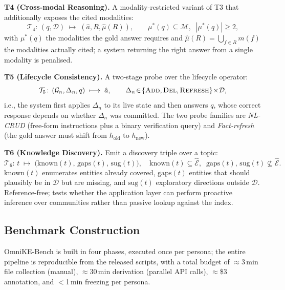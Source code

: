 \documentclass{article}
\begin{document}
\noindent\textbf{T4 (Cross-modal Reasoning).} A modality-restricted variant of T3 that additionally exposes the cited modalities:
\begin{equation}
\mathcal{T}_4\!:\,(q,\mathcal{D})\;\longmapsto\;(\hat{a},R,\hat{\mu}(R)),\qquad \mu^{*}(q)\!\subseteq\!\mathcal{M},\;\;|\mu^{*}(q)|\!\geq\!2,
\label{eq:t-t4}
\end{equation}
with $\mu^{*}(q)$ the modalities the gold answer requires and $\hat{\mu}(R)\!=\!\bigcup_{f\in R}m(f)$ the modalities actually cited; a system returning the right answer from a single modality is penalised.

\noindent\textbf{T5 (Lifecycle Consistency).} A two-stage probe over the lifecycle operator:
\begin{equation}
\mathcal{T}_5\!:\,(\mathcal{G}_n,\Delta_n,q)\;\longmapsto\;\hat{a},\qquad \Delta_n\!\in\!\{\textsc{Add},\textsc{Del},\textsc{Refresh}\}\!\times\!\mathcal{D},
\label{eq:t-t5}
\end{equation}
i.e., the system first applies $\Delta_n$ to its live state and then answers $q$, whose correct response depends on whether $\Delta_n$ was committed. The two probe families are \emph{NL-CRUD} (free-form instructions plus a binary verification query) and \emph{Fact-refresh} (the gold answer must shift from $h_{\mathrm{old}}$ to $h_{\mathrm{new}}$).

\noindent\textbf{T6 (Knowledge Discovery).} Emit a discovery triple over a topic:
\begin{equation}
\mathcal{T}_6\!:\,t\;\longmapsto\;\bigl(\mathrm{known}(t),\,\mathrm{gaps}(t),\,\mathrm{sug}(t)\bigr),\quad \mathrm{known}(t)\!\subseteq\!\hat{\mathcal{E}},\;\;\mathrm{gaps}(t),\,\mathrm{sug}(t)\!\not\subseteq\!\hat{\mathcal{E}}.
\label{eq:t-t6}
\end{equation}
$\mathrm{known}(t)$ enumerates entities already covered, $\mathrm{gaps}(t)$ entities that should plausibly be in $\mathcal{D}$ but are missing, and $\mathrm{sug}(t)$ exploratory directions outside $\mathcal{D}$. Reference-free; tests whether the application layer can perform proactive inference over communities rather than passive lookup against the index.

\subsection{Benchmark Construction}\label{app:bench-pipe}

OmniKE-Bench is built in four phases, executed once per persona; the entire pipeline is reproducible from the released scripts, with a total budget of $\approx$3\,min file collection (manual), $\approx$30\,min derivation (parallel API calls), $\approx$\$3 annotation, and $<$1\,min freezing per persona.
\end{document}
